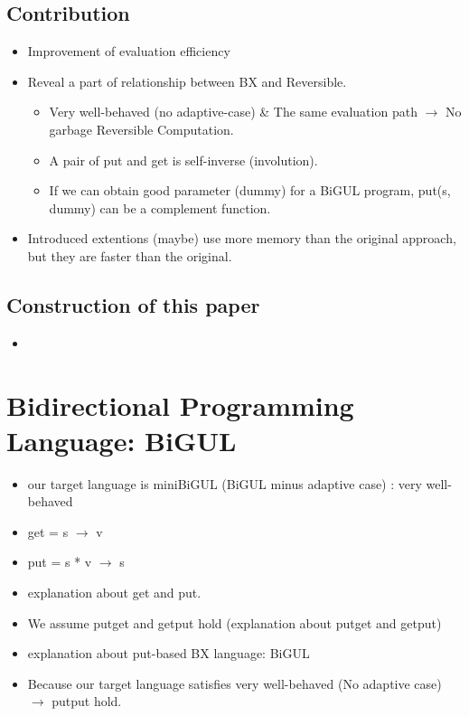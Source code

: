 \documentclass[runningheads]{llncs}
\begin{document}
\subsection{Contribution}

\begin{itemize}
\item Improvement of evaluation efficiency
\item Reveal a part of relationship between BX and Reversible.
  \begin{itemize}
  \item Very well-behaved (no adaptive-case) \& The same evaluation path $\to$ No garbage Reversible Computation.
  \item A pair of put and get is self-inverse (involution).
  \item If we can obtain good parameter (dummy) for a BiGUL program,
    put(s, dummy) can be a complement function.
  \end {itemize}
\item Introduced extentions (maybe) use more memory than the original approach, but they are faster than the original.
\end{itemize}

\subsection{Construction of this paper}

\begin{itemize}
\item 
\end{itemize}

\section{Bidirectional Programming Language: BiGUL}

\begin{itemize}
\item our target language is miniBiGUL (BiGUL minus adaptive case) : very well-behaved
\item get = s $\to$ v
\item put = s * v $\to$ s
\item explanation about get and put.
\item We assume putget and getput hold (explanation about putget and getput)
\item explanation about put-based BX language: BiGUL
\item Because our target language satisfies very well-behaved (No adaptive case) $\to$ putput hold.
\end{itemize}
\end{document}
